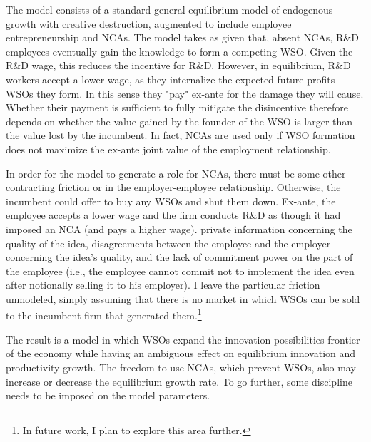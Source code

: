 \documentclass[11pt,english]{article}
\begin{document}
The model consists of a standard general equilibrium model of endogenous growth with creative destruction, augmented to include employee entrepreneurship and NCAs. The model takes as given that, absent NCAs, R\&D employees eventually gain the knowledge to form a competing WSO. Given the R\&D wage, this reduces the incentive for R\&D. However, in equilibrium, R\&D workers accept a lower wage, as they internalize the expected future profits WSOs they form. In this sense they "pay" ex-ante for the damage they will cause. Whether their payment is sufficient to fully mitigate the disincentive therefore depends on whether the value gained by the founder of the WSO is larger than the value lost by the incumbent. In fact, NCAs are used only if WSO formation does not maximize the ex-ante joint value of the employment relationship. 

In order for the model to generate a role for NCAs, there must be some other contracting friction or in the employer-employee relationship.  Otherwise, the incumbent could offer to buy any WSOs and shut them down. Ex-ante, the employee accepts a lower wage and the firm conducts R\&D as though it had imposed an NCA (and pays a higher wage). private information concerning the quality of the idea, disagreements between the employee and the employer concerning the idea's quality, and the lack of commitment power on the part of the employee (i.e., the employee cannot commit not to implement the idea even after notionally selling it to his employer). I leave the particular friction unmodeled, simply assuming that there is no market in which WSOs can be sold to the incumbent firm that generated them.\footnote{In future work, I plan to explore this area further.}

The result is a model in which WSOs expand the innovation possibilities frontier of the economy while having an ambiguous effect on equilibrium innovation and productivity growth. The freedom to use NCAs, which prevent WSOs, also may increase or decrease the equilibrium growth rate. To go further, some discipline needs to be imposed on the model parameters.
\end{document}
